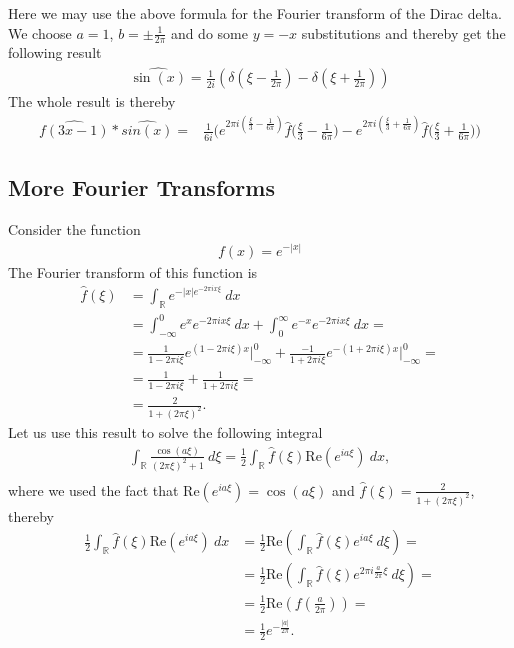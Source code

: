 \documentclass[a4paper]{article}
\begin{document}
Here we may use the above formula for the Fourier transform of the Dirac
delta. We choose $a=1$, $b= \pm \frac{1}{2\pi}$ and do some $y=-x$
substitutions and thereby get the following result
\begin{align}
    \widehat{\sin(x)} = \frac{1}{2i} \left(
        \delta(\xi - \frac{1}{2\pi})
        -\delta(\xi + \frac{1}{2\pi})
        \right)
\end{align}
The whole result is thereby
\begin{align}
    \widehat{f(3x-1)} * \widehat{sin(x)}
    =& \frac{1}{6i} \bigg(
        e^{2\pi
        i(\frac{\xi}{3}-\frac{1}{6\pi})}\hat{f}\big(\frac{\xi}{3}-\frac{1}{6\pi}\big)-
        e^{2\pi
            i(\frac{\xi}{3}+\frac{1}{6\pi})}\hat{f}\big(\frac{\xi}{3}+\frac{1}{6\pi}\big)
        \bigg)
\end{align}
\subsection{More Fourier Transforms}
Consider the function
\begin{align}
    f(x) = e^{-|x|}
\end{align}
The Fourier transform of this function is
\begin{align}
    \hat{f}(\xi)
    &=\int_\mathbb{R} e^{-|x| e^{-2\pi i x \xi}}\ dx\\
    &= \int_{-\infty}^0 e^x e^{-2\pi i x \xi}\ dx
    + \int_0^\infty e^{-x} e^{-2\pi i x \xi}\ dx=\\
    &= \frac{1}{1-2\pi i \xi} e^{(1-2\pi i \xi) x}\bigg|_{-\infty}^0+
        \frac{-1}{1+2\pi i \xi} e^{-(1+2\pi i \xi) x}\bigg|_{-\infty}^0 = \\
    &= \frac{1}{1-2\pi i \xi} + \frac{1}{1 + 2\pi i \xi} =\\
    &= \frac{2}{1+(2\pi \xi)^2}.
\end{align}
Let us use this result to solve the following integral
\begin{align}
    \int_\mathbb{R} \frac{\cos(a\xi)}{(2\pi \xi)^2 + 1}\ d\xi =
    \frac{1}{2}\int_\mathbb{R} \hat{f}(\xi) \text{Re}(e^{ia\xi})\ dx,\\
\end{align}
where we used the fact that $\text{Re}(e^{ia\xi}) = \cos(a\xi)$ and
$\hat{f}(\xi) = \frac{2}{1+(2\pi \xi)^2}$, thereby
\begin{align}
    \frac{1}{2}\int_\mathbb{R} \hat{f}(\xi) \text{Re}(e^{ia\xi})\ dx
    &= \frac{1}{2}\text{Re}\left(
        \int_\mathbb{R}\hat{f}(\xi)e^{ia\xi}\ d\xi
    \right)=\\
    &= \frac{1}{2}\text{Re}\left(
        \int_\mathbb{R} \hat{f}(\xi) e^{2\pi i \frac{a}{2\pi}\xi}\ d\xi
    \right)=\\
    &= \frac{1}{2}\text{Re}\left(f(\frac{a}{2\pi})\right)=\\
    &= \frac{1}{2} e^{-\frac{|a|}{2\pi}}.
\end{align}
\end{document}

